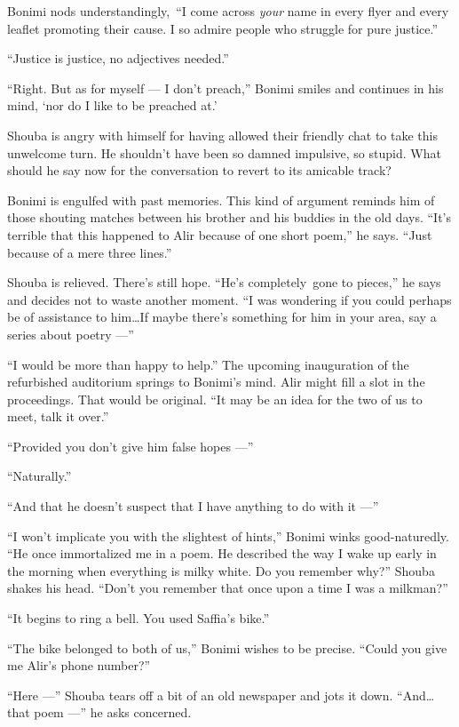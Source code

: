 \documentclass[twoside,11pt,openany]{book}
\begin{document}
Bonimi nods understandingly,~``I come across \textit{your }name in every flyer and every leaflet promoting
their cause. I so admire people who struggle for pure justice.''

``Justice is justice, no adjectives needed.''

``Right. But as for myself --- I don't preach,'' Bonimi smiles and continues in his mind, `nor
do I like to be preached at.'

Shouba is angry with himself for having allowed their friendly chat to take this unwelcome turn. He shouldn't have been
so damned impulsive, so stupid. What should he say now for the conversation to revert to its amicable track?

Bonimi is engulfed with past memories. This kind of argument reminds him of those shouting matches between his brother
and his buddies in the old days. ``It's terrible that this happened to Alir because of one
short poem,''  he says. ``Just because of{ }{a }mere three lines.''

Shouba is relieved. There's still hope. ``He's completely~gone to pieces,'' he says and
decides not to waste another moment. ``I was wondering if you could perhaps be of assistance to
him{\ldots}If maybe there's something for him in your area, say a series about poetry ---''

``I would be more than happy to help.''  The upcoming inauguration of the refurbished
auditorium springs to Bonimi's mind. Alir might fill a slot in the proceedings. That would be original.
``It may be an idea for the two of us to meet, talk it over.''

``Provided you don't give him false hopes ---''

``Naturally.''

``And that he doesn't suspect that I have anything to do with it ---''

``I won't implicate you with the slightest of hints,'' Bonimi winks good-naturedly.
``He once immortalized me in a poem. He described the way I wake up early in the morning when everything
is milky white. Do you remember why?'' Shouba shakes his head. ``Don't you remember that once
upon a time I was a milkman?''

``It begins to ring a bell. You used Saffia's bike.''

``The bike belonged to both of us,'' Bonimi wishes to be precise. ``Could you
give me Alir's phone number?''

``Here ---'' Shouba tears off {a bit of an }old newspaper and jots it
down.  ``And{\ldots}that poem ---'' he asks concerned.
\end{document}
